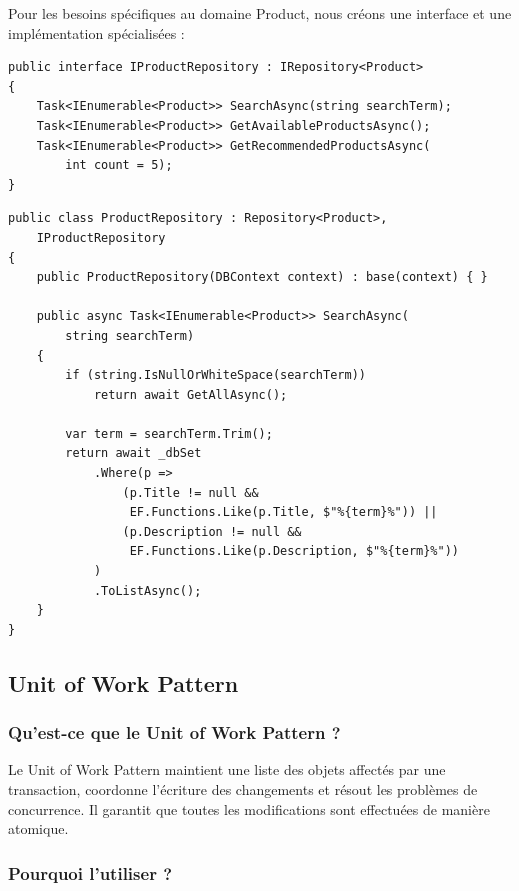 \documentclass[12pt,a4paper]{article}
\begin{document}
Pour les besoins spécifiques au domaine Product, nous créons une interface et une implémentation spécialisées :

\begin{lstlisting}[caption=Interface IProductRepository, float=h!]
public interface IProductRepository : IRepository<Product>
{
    Task<IEnumerable<Product>> SearchAsync(string searchTerm);
    Task<IEnumerable<Product>> GetAvailableProductsAsync();
    Task<IEnumerable<Product>> GetRecommendedProductsAsync(
        int count = 5);
}
\end{lstlisting}

\begin{lstlisting}[caption=Implémentation ProductRepository, float=h!]
public class ProductRepository : Repository<Product>, 
    IProductRepository
{
    public ProductRepository(DBContext context) : base(context) { }

    public async Task<IEnumerable<Product>> SearchAsync(
        string searchTerm)
    {
        if (string.IsNullOrWhiteSpace(searchTerm))
            return await GetAllAsync();

        var term = searchTerm.Trim();
        return await _dbSet
            .Where(p =>
                (p.Title != null && 
                 EF.Functions.Like(p.Title, $"%{term}%")) ||
                (p.Description != null && 
                 EF.Functions.Like(p.Description, $"%{term}%"))
            )
            .ToListAsync();
    }
}
\end{lstlisting}

\subsection{Unit of Work Pattern}

\subsubsection{Qu'est-ce que le Unit of Work Pattern ?}

Le Unit of Work Pattern maintient une liste des objets affectés par une transaction, coordonne l'écriture des changements et résout les problèmes de concurrence. Il garantit que toutes les modifications sont effectuées de manière atomique.

\subsubsection{Pourquoi l'utiliser ?}
\end{document}
